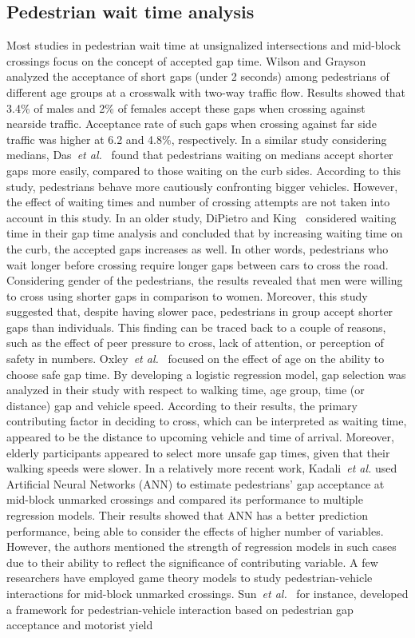 \subsection{Pedestrian wait time analysis}
Most studies in pedestrian wait time at unsignalized intersections and mid-block crossings focus on the concept of accepted gap time. Wilson and Grayson~\cite{wilson1980age} analyzed the acceptance of short gaps (under 2 seconds) among pedestrians of different age groups at a crosswalk with two-way traffic flow. Results showed that 3.4\% of males and 2\% of females accept these gaps when crossing against nearside traffic. Acceptance rate of such gaps when crossing against far side traffic was higher at 6.2 and 4.8\%, respectively.
In a similar study considering medians, Das~\textit{et al.}~\cite{das2005walk} found that pedestrians waiting on medians accept shorter gaps more easily, compared to those waiting on the curb sides.  According to this study, pedestrians behave more cautiously confronting bigger vehicles. However, the effect of waiting times and number of crossing attempts are not taken into account in this study. In an older study, DiPietro and King~\cite{dipietro1970pedestrian} considered waiting time in their gap time analysis and concluded that by increasing waiting time on the curb, the accepted gaps increases as well. In other words, pedestrians who wait longer before crossing require longer gaps between cars to cross the road. Considering gender of the pedestrians, the results revealed that men were willing to cross using shorter gaps in comparison to women. Moreover, this study suggested that, despite having slower pace, pedestrians in group accept shorter gaps than individuals. This finding can be traced back to a couple of reasons, such as the effect of peer pressure to cross, lack of attention, or perception of safety in numbers. Oxley~\textit{et al.}~\cite{oxley2005crossing} focused on the effect of age on the ability to choose safe gap time. By developing a logistic regression model, gap selection was analyzed in their study with respect to walking time, age group, time (or distance) gap and vehicle speed. According to their results, the primary contributing factor in deciding to cross, which can be interpreted as waiting time, appeared to be the distance to upcoming vehicle and time of arrival. Moreover, elderly participants appeared to select more unsafe gap times, given that their walking speeds were slower. In a relatively more recent work, Kadali~\textit{et al.} used Artificial Neural Networks (ANN) to estimate pedestrians' gap acceptance at mid-block unmarked crossings and compared its performance to multiple regression models. Their results showed that ANN has a better prediction performance, being able to consider the effects of higher number of variables. However, the authors mentioned the strength of regression models in such cases due to their ability to reflect the significance of contributing variable. A few researchers have employed game theory models to study pedestrian-vehicle interactions for mid-block unmarked crossings. Sun~\textit{et al.}~\cite{sun2003modeling} for instance, developed a framework for pedestrian-vehicle interaction based on pedestrian gap acceptance and motorist yield 